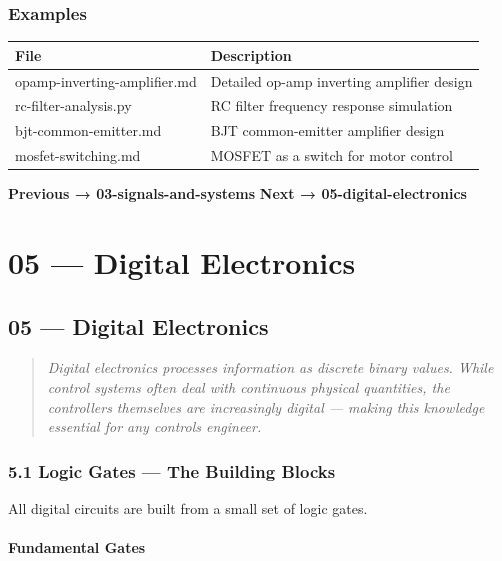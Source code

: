 \documentclass[11pt,a4paper]{book}
\begin{document}
\medskip\noindent\hrulefill\medskip

\subsection{Examples}

\begin{center}
\begin{tabular}{|l|l|}
\hline
File & Description \\
\hline
opamp-inverting-amplifier.md & Detailed op-amp inverting amplifier design \\
rc-filter-analysis.py & RC filter frequency response simulation \\
bjt-common-emitter.md & BJT common-emitter amplifier design \\
mosfet-switching.md & MOSFET as a switch for motor control \\
\hline
\end{tabular}
\end{center}

\medskip\noindent\hrulefill\medskip

\textbf{Previous → 03-signals-and-systems}  
\textbf{Next → 05-digital-electronics}


\chapter{05 — Digital Electronics}
\section{05 — Digital Electronics}

\begin{quote}
\textit{Digital electronics processes information as discrete binary values. While control systems often deal with continuous physical quantities, the controllers themselves are increasingly digital — making this knowledge essential for any controls engineer.}
\end{quote}

\medskip\noindent\hrulefill\medskip

\subsection{5.1 Logic Gates — The Building Blocks}

All digital circuits are built from a small set of logic gates.

\subsubsection{Fundamental Gates}
\end{document}
